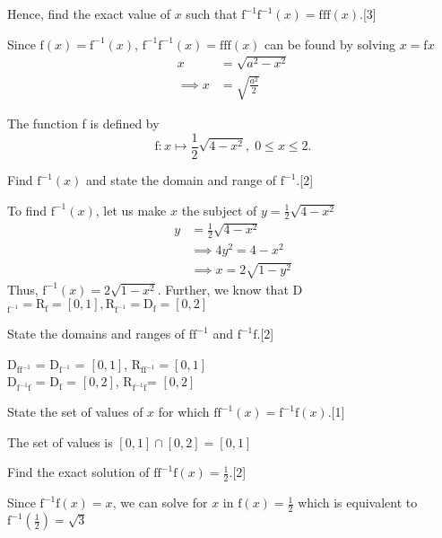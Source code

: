\documentclass[12pt, a4 paper]{article}
\begin{document}
\begin{outline}[enumerate]
	\2 Hence, find the exact value of $x$ such that $\textrm{f}^{-1}\textrm{f}^{-1}(x)=\textrm{f}\textrm{f}\textrm{f}(x)$.\hfill[3]
	\begin{answer}
		Since $\textrm{f}(x)=\textrm{f}^{-1}(x)$, $\textrm{f}^{-1}\textrm{f}^{-1}(x)=\textrm{f}\textrm{f}\textrm{f}(x)$ can be found by solving $x=\mathrm{f}x$
		\begin{align*}
			x          & =\sqrt{a^2-x^2}       \\
			\implies x & =\sqrt{\frac{a^2}{2}} 
		\end{align*}
	\end{answer}
		        
	\1 The function f is defined by \[\textrm{f}:x \mapsto \frac{1}{2}\sqrt{4-x^2},\;0\leq x \leq2.\] %
		    
	\2 Find $\textrm{f}^{-1}(x)$ and state the domain and range of $\textrm{f}^{-1}$.\hfill[2]
	\begin{answer}
		To find $\textrm{f}^{-1}(x)$, let us make $x$ the subject of $y=\frac{1}{2}\sqrt{4-x^2}$
		\begin{align*}
			y & =\frac{1}{2}\sqrt{4-x^2}   \\
			  & \implies 4y^2=4-x^2        \\
			  & \implies x = 2\sqrt{1-y^2} 
		\end{align*}
		Thus, $\textrm{f}^{-1}(x)=2\sqrt{1-x^2}$. Further, we know that D$_{\textrm{f}^{-1}} = \textrm{R}_\textrm{f} = [0,1], \textrm{R}_{\textrm{f}^{-1}} = \textrm{D}_\textrm{f} = [0,2]$
	\end{answer}
		        
	\2 State the domains and ranges of $\textrm{f}\textrm{f}^{-1}$ and $\textrm{f}^{-1}\textrm{f}$.\hfill[2]
	\begin{answer}
		D$_{\textrm{f}\textrm{f}^{-1}}$ = D$_{\textrm{f}^{-1}}$ = $[0,1]$, R$_{\textrm{f}\textrm{f}^{-1}} = [0,1]$ \\
		D$_{\textrm{f}^{-1}\textrm{f}}$ = D$_{\textrm{f}}$ = $[0,2]$, R$_{\textrm{f}^{-1}\textrm{f}}$= $[0,2]$
	\end{answer}
		        
	\2 State the set of values of $x$ for which $\textrm{f}\textrm{f}^{-1}(x)=\textrm{f}^{-1}\textrm{f}(x)$.\hfill[1]
	\begin{answer}
		The set of values is $[0,1] \cap [0,2] = [0,1]$
	\end{answer}
		        
	\2 Find the exact solution of $\textrm{f}\textrm{f}^{-1}\textrm{f}(x)=\frac{1}{2}$.\hfill[2]
	\begin{answer}
		Since $\textrm{f}^{-1}\textrm{f}(x)=x$, we can solve for $x$ in $\textrm{f}(x)=\frac{1}{2}$ which is equivalent to $\textrm{f}^{-1}(\frac{1}{2})=\sqrt{3}$
	\end{answer}
		        

\end{outline}
\end{document}
